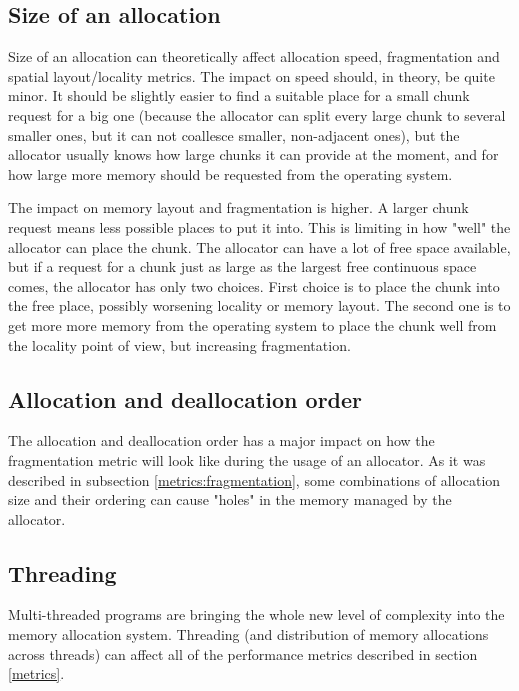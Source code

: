 \subsection{Size of an allocation}

Size of an allocation can theoretically affect allocation speed, fragmentation
and spatial layout/locality metrics. The impact on speed should, in theory, be
quite minor. It should be slightly easier to find a suitable place for a small
chunk request for a big one (because the allocator can split every large chunk to
several smaller ones, but it can not coallesce smaller, non-adjacent ones), but
the allocator usually knows how large chunks it can provide at the moment, and
for how large more memory should be requested from the operating system.

The impact on memory layout and fragmentation is higher. A larger chunk request
means less possible places to put it into. This is limiting in how "well" the
allocator can place the chunk. The allocator can have a lot of free space
available, but if a request for a chunk just as large as the largest free
continuous space comes, the allocator has only two choices. First choice is to
place the chunk into the free place, possibly worsening locality or memory
layout. The second one is to get more more memory from the operating system to
place the chunk well from the locality point of view, but increasing
fragmentation.

\subsection{Allocation and deallocation order}

The allocation and deallocation order has a major impact on how the fragmentation
metric will look like during the usage of an allocator. As it was described in
subsection \ref{metrics:fragmentation}, some combinations of allocation size and
their ordering can cause "holes" in the memory managed by the allocator.

\subsection{Threading}

Multi-threaded programs are bringing the whole new level of complexity into the
memory allocation system. Threading (and distribution of memory allocations
across threads) can affect all of the performance metrics described in section
\ref{metrics}.

